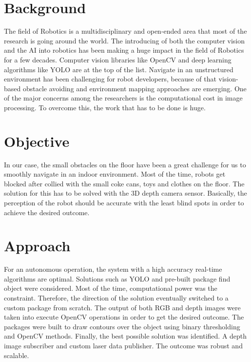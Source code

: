 \documentclass[twoside,12pt,times,onecolumn,a4paper]{report}
\begin{document}
\section{Background}

\hspace{3em}The field of Robotics is a multidisciplinary and open-ended area that most of the research is going around the world. The introducing of both the computer vision and the AI into robotics has been making a huge impact in the field of Robotics for a few decades. Computer vision libraries like OpenCV and deep learning algorithms like YOLO are at the top of the list. Navigate in an unstructured environment has been challenging for robot developers, because of that vision-based obstacle avoiding and environment mapping approaches are emerging. One of the major concerns among the researchers is the computational cost in image processing. To overcome this, the work that has to be done is huge.

\section{Objective}

In our case, the small obstacles on the floor have been a great challenge for 
us to smoothly navigate in an indoor environment. Most of the time, robots get 
blocked after collied with the small coke cans, toys and clothes on the floor. 
The solution for this has to be solved with the 3D depth camera sensor. Basically, 
the perception of the robot should be accurate with the least blind spots in order to 
achieve the desired outcome. 

\section{Approach}

For an autonomous operation, the system with a high accuracy real-time algorithms are optimal. Solutions such as YOLO and pre-built package find object were considered. Most of the time, computational power was the 
constraint. Therefore, the direction of the solution eventually switched to a custom 
package from scratch. The output of both RGB and depth images were taken into 
execute OpenCV operations in order to get the desired outcome. The packages 
were built to draw contours over the object using binary thresholding and OpenCV 
methods. Finally, the best possible solution was identified. A depth image 
subscriber and custom laser data publisher. The outcome was robust and scalable.
\end{document}
